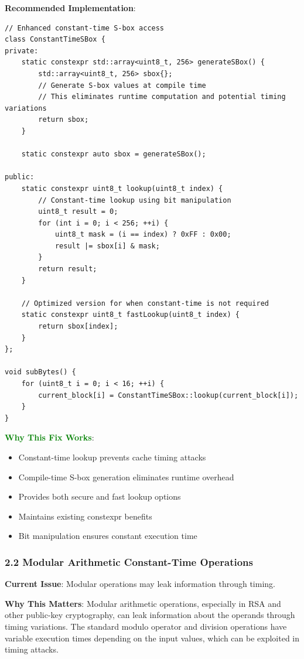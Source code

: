 \documentclass[11pt,a4paper]{article}
\begin{document}
\textbf{Recommended Implementation}:
\begin{lstlisting}
// Enhanced constant-time S-box access
class ConstantTimeSBox {
private:
    static constexpr std::array<uint8_t, 256> generateSBox() {
        std::array<uint8_t, 256> sbox{};
        // Generate S-box values at compile time
        // This eliminates runtime computation and potential timing variations
        return sbox;
    }
    
    static constexpr auto sbox = generateSBox();
    
public:
    static constexpr uint8_t lookup(uint8_t index) {
        // Constant-time lookup using bit manipulation
        uint8_t result = 0;
        for (int i = 0; i < 256; ++i) {
            uint8_t mask = (i == index) ? 0xFF : 0x00;
            result |= sbox[i] & mask;
        }
        return result;
    }
    
    // Optimized version for when constant-time is not required
    static constexpr uint8_t fastLookup(uint8_t index) {
        return sbox[index];
    }
};

void subBytes() {
    for (uint8_t i = 0; i < 16; ++i) {
        current_block[i] = ConstantTimeSBox::lookup(current_block[i]);
    }
}
\end{lstlisting}

\textcolor{green}{\textbf{Why This Fix Works}}:
\begin{itemize}
    \item Constant-time lookup prevents cache timing attacks
    \item Compile-time S-box generation eliminates runtime overhead
    \item Provides both secure and fast lookup options
    \item Maintains existing constexpr benefits
    \item Bit manipulation ensures constant execution time
\end{itemize}

\subsubsection{2.2 Modular Arithmetic Constant-Time Operations}

\textbf{Current Issue}: Modular operations may leak information through timing.

\textbf{Why This Matters}: Modular arithmetic operations, especially in RSA and other public-key cryptography, can leak information about the operands through timing variations. The standard modulo operator and division operations have variable execution times depending on the input values, which can be exploited in timing attacks.
\end{document}
